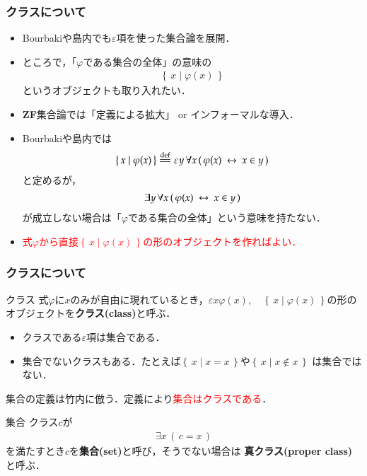 \documentclass[dvipdfmx,10pt,notheorems]{beamer}
\theoremstyle{definition}
\newcommand{\Set}[2]{\left\{\, #1 \mid #2\, \right\}} %
\newcommand{\defeq}{\overset{\mathrm{def}}{=\joinrel=}} %
\newcommand{\lrarrow}{\hspace{0.25em}\leftrightarrow\hspace{0.25em}} %
\begin{document}
\begin{frame}\frametitle{クラスについて}
	\begin{itemize}
		\item Bourbaki\cite{}や島内\cite{}でも$\varepsilon$項を使った集合論を展開．
		
		\item ところで，「$\varphi$である集合の全体」の意味の
			\begin{align}
				\Set{x}{\varphi(x)}
			\end{align}
			というオブジェクトも取り入れたい．
		
		\item {\bf ZF}集合論では「定義による拡大」 or インフォーマルな導入．
		
		\item Bourbaki\cite{}や島内\cite{}では
			\begin{align}
				\Set{x}{\varphi(x)} \defeq \varepsilon y\, \forall x\, 
				(\, \varphi(x) \lrarrow x \in y\, )
			\end{align}
			と定めるが，
			\begin{align}
				\exists y\, \forall x\, (\, \varphi(x) \lrarrow x \in y\, )
			\end{align}
			が成立しない場合は「$\varphi$である集合の全体」という意味を持たない．
			
		\item \textcolor{red}{式$\varphi$から直接$\Set{x}{\varphi(x)}$の形のオブジェクトを作ればよい．}
	\end{itemize}
\end{frame}

\begin{frame}\frametitle{クラスについて}
	\begin{exampleblock}{クラス}
		式$\varphi$に$x$のみが自由に現れているとき，$\varepsilon x \varphi(x),
		\quad \Set{x}{\varphi(x)}$の形のオブジェクトを{\bf クラス(class)}と呼ぶ．
	\end{exampleblock}
	
	\begin{itemize}
		\item クラスである$\varepsilon$項は集合である．
		\item 集合でないクラスもある．たとえば$\Set{x}{x = x}$や$\Set{x}{x \notin x}$
			は集合ではない．
	\end{itemize}
	
	集合の定義は竹内\cite{}に倣う．定義により\textcolor{red}{集合はクラスである}．
	\begin{exampleblock}{集合}
		クラス$c$が
		\begin{align}
			\exists x\, (\, c = x\, )
		\end{align}
		を満たすとき$c$を{\bf 集合(set)}と呼び，そうでない場合は
		{\bf 真クラス(proper class)}と呼ぶ．
	\end{exampleblock}
\end{frame}
\end{document}
